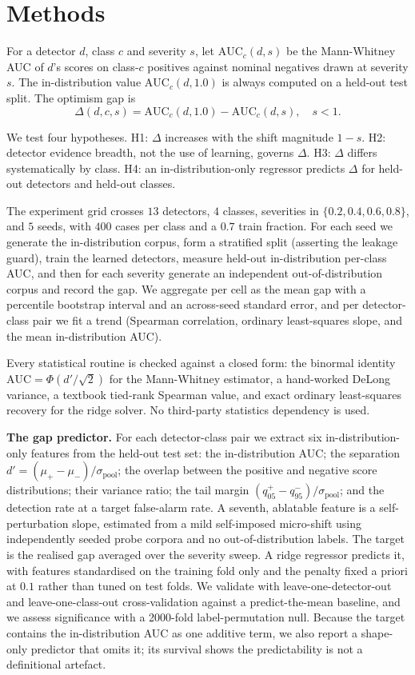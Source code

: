 \documentclass[conference]{IEEEtran}
\begin{document}
\section{Methods}
For a detector $d$, class $c$ and severity $s$, let $\mathrm{AUC}_c(d,s)$ be the
Mann-Whitney AUC of $d$'s scores on class-$c$ positives against nominal negatives
drawn at severity $s$. The in-distribution value $\mathrm{AUC}_c(d,1.0)$ is always
computed on a held-out test split. The optimism gap is
\begin{equation}
\Delta(d,c,s) = \mathrm{AUC}_c(d,1.0) - \mathrm{AUC}_c(d,s), \quad s < 1.
\end{equation}

We test four hypotheses. H1: $\Delta$ increases with the shift magnitude $1-s$.
H2: detector evidence breadth, not the use of learning, governs $\Delta$. H3:
$\Delta$ differs systematically by class. H4: an in-distribution-only regressor
predicts $\Delta$ for held-out detectors and held-out classes.

The experiment grid crosses $13$ detectors, $4$ classes, severities in
$\{0.2,0.4,0.6,0.8\}$, and $5$ seeds, with $400$ cases per class and a $0.7$ train
fraction. For each seed we generate the in-distribution corpus, form a stratified
split (asserting the leakage guard), train the learned detectors, measure held-out
in-distribution per-class AUC, and then for each severity generate an independent
out-of-distribution corpus and record the gap. We aggregate per cell as the mean
gap with a percentile bootstrap interval and an across-seed standard error, and
per detector-class pair we fit a trend (Spearman correlation, ordinary
least-squares slope, and the mean in-distribution AUC).

Every statistical routine is checked against a closed form: the binormal identity
$\mathrm{AUC}=\Phi(d'/\sqrt2)$ for the Mann-Whitney estimator, a hand-worked DeLong
variance, a textbook tied-rank Spearman value, and exact ordinary least-squares
recovery for the ridge solver. No third-party statistics dependency is used.

\textbf{The gap predictor.}
For each detector-class pair we extract six in-distribution-only features from the
held-out test set: the in-distribution AUC; the separation
$d'=(\mu_{+}-\mu_{-})/\sigma_{\text{pool}}$; the overlap between the positive and
negative score distributions; their variance ratio; the tail margin
$(q_{05}^{+}-q_{95}^{-})/\sigma_{\text{pool}}$; and the detection rate at a target
false-alarm rate. A seventh, ablatable feature is a self-perturbation slope,
estimated from a mild self-imposed micro-shift using independently seeded probe
corpora and no out-of-distribution labels. The target is the realised gap averaged
over the severity sweep. A ridge regressor predicts it, with features standardised
on the training fold only and the penalty fixed a priori at $0.1$ rather than tuned
on test folds. We validate with leave-one-detector-out and leave-one-class-out
cross-validation against a predict-the-mean baseline, and we assess significance
with a 2000-fold label-permutation null. Because the target contains the
in-distribution AUC as one additive term, we also report a shape-only predictor
that omits it; its survival shows the predictability is not a definitional artefact.
\end{document}
